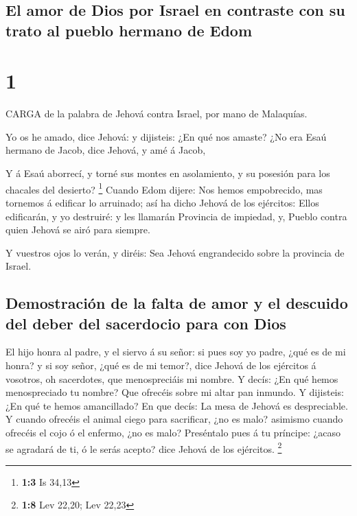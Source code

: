 \hypertarget{el-amor-de-dios-por-israel-en-contraste-con-su-trato-al-pueblo-hermano-de-edom}{%
\subsection{El amor de Dios por Israel en contraste con su trato al
pueblo hermano de
Edom}\label{el-amor-de-dios-por-israel-en-contraste-con-su-trato-al-pueblo-hermano-de-edom}}

\hypertarget{section}{%
\section{1}\label{section}}

 CARGA de la palabra de Jehová contra Israel, por mano de
Malaquías.

 Yo os he amado, dice Jehová: y dijisteis: ¿En qué nos
amaste? ¿No era Esaú hermano de Jacob, dice Jehová, y amé á Jacob,

 Y á Esaú aborrecí, y torné sus montes en asolamiento, y su
posesión para los chacales del desierto? \footnote{\textbf{1:3} Is 34,13}
 Cuando Edom dijere: Nos hemos empobrecido, mas tornemos á
edificar lo arruinado; así ha dicho Jehová de los ejércitos: Ellos
edificarán, y yo destruiré: y les llamarán Provincia de impiedad, y,
Pueblo contra quien Jehová se airó para siempre.

 Y vuestros ojos lo verán, y diréis: Sea Jehová engrandecido
sobre la provincia de Israel.

\hypertarget{demostraciuxf3n-de-la-falta-de-amor-y-el-descuido-del-deber-del-sacerdocio-para-con-dios}{%
\subsection{Demostración de la falta de amor y el descuido del deber del
sacerdocio para con
Dios}\label{demostraciuxf3n-de-la-falta-de-amor-y-el-descuido-del-deber-del-sacerdocio-para-con-dios}}

 El hijo honra al padre, y el siervo á su señor: si pues soy
yo padre, ¿qué es de mi honra? y si soy señor, ¿qué es de mi temor?,
dice Jehová de los ejércitos á vosotros, oh sacerdotes, que
menospreciáis mi nombre. Y decís: ¿En qué hemos menospreciado tu nombre?
 Que ofrecéis sobre mi altar pan inmundo. Y dijisteis: ¿En
qué te hemos amancillado? En que decís: La mesa de Jehová es
despreciable.  Y cuando ofrecéis el animal ciego para
sacrificar, ¿no es malo? asimismo cuando ofrecéis el cojo ó el enfermo,
¿no es malo? Preséntalo pues á tu príncipe: ¿acaso se agradará de ti, ó
le serás acepto? dice Jehová de los ejércitos. \footnote{\textbf{1:8}
  Lev 22,20; Lev 22,23}

